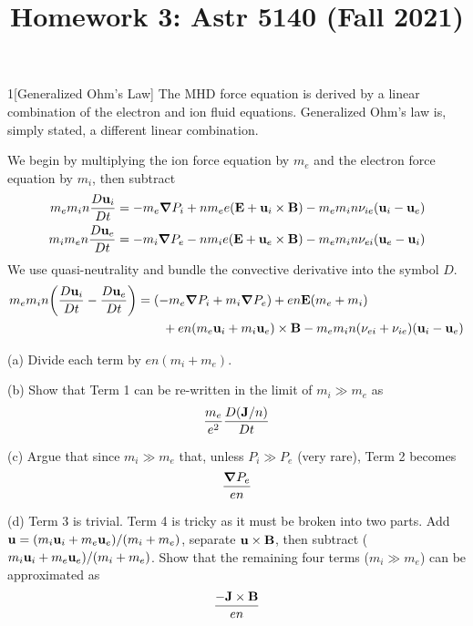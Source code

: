 \documentclass[12pt]{article}
\title{Homework 3: Astr 5140 (Fall 2021)}
\begin{document}
\maketitle
\begin{problem}{1}[Generalized Ohm's Law]
The MHD force equation is derived by a linear combination of the electron and
ion fluid equations. Generalized Ohm's law is, simply stated, a different linear
combination.

We begin by multiplying the ion force equation by $m_e$ and the electron force
equation by $m_i$, then subtract
\begin{subequations}
    \begin{align}
        m_em_in\frac{D\vb{u}_i}{D t}
        &=-m_e\grad P_i+nm_ee(\vb{E}+\vb{u}_i\times\vb{B})
            -m_em_in\nu_{ie}(\vb{u}_i-\vb{u}_e)\\
        m_im_en\frac{D\vb{u}_e}{D t}
        &=-m_i\grad P_e-nm_ie(\vb{E}+\vb{u}_e\times\vb{B})
            -m_em_in\nu_{ei}(\vb{u}_e-\vb{u}_i)
    \end{align}
\end{subequations}
We use quasi-neutrality and bundle the convective derivative into the symbol
$D$.
\begin{align}
    m_em_in\qty(\frac{D\vb{u}_i}{Dt}-\frac{D\vb{u}_e}{Dt})
    &=\qty(-m_e\grad P_i+m_i\grad P_e)
    +en\vb{E}(m_e+m_i)\notag\\
    &\qquad+en\qty(m_e\vb{u}_i+m_i\vb{u}_e)\times\vb{B}
    -m_em_in(\nu_{ei}+\nu_{ie})(\vb{u}_i-\vb{u}_e)
\end{align}

(a) Divide each term by $en(m_i+m_e)$.

(b) Show that Term 1 can be re-written in the limit of $m_i\gg m_e$ as
\begin{equation}
    \frac{m_e}{e^2}\frac{D(\vb{J}/n)}{Dt} 
\end{equation}

(c) Argue that since $m_i\gg m_e$ that, unless $P_i\gg P_e$ (very rare), Term 2
becomes
\begin{equation}
    \frac{\grad P_e}{en} 
\end{equation}

(d) Term 3 is trivial. Term 4 is tricky as it must be broken into two parts. Add
$\vb{u}=(m_i\vb{u}_i+m_e\vb{u}_e) /(m_i+m_e)$, separate $\vb{u}\times\vb{B}$,
then subtract ($m_i\vb{u}_i+m_e\vb{u}_e) /(m_i+m_e)$. Show that the remaining
four terms ($m_i\gg m_e$) can be approximated as
\begin{equation}
    \frac{-\vb{J}\times\vb{B}}{en} 
\end{equation}


\end{problem}
\end{document}
